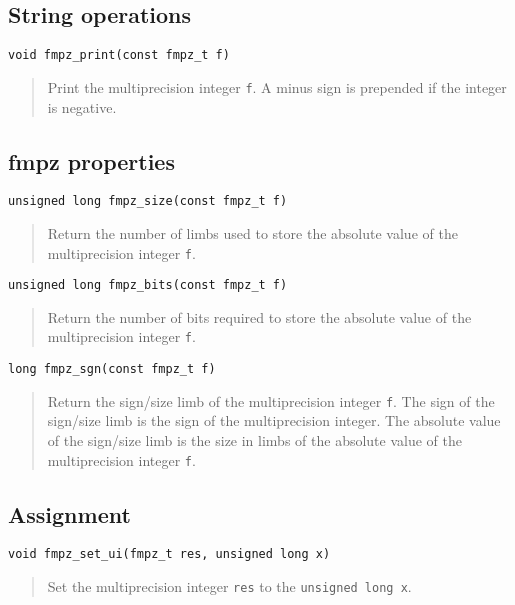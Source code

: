 \documentclass[a4paper,10pt]{article}
\newcommand{\code}{\lstinline}
\begin{document}
\subsection{String operations}

\begin{lstlisting}
void fmpz_print(const fmpz_t f)
\end{lstlisting}
\begin{quote}
Print the multiprecision integer \code{f}. A minus sign is prepended if the integer is negative.
\end{quote}

\subsection{fmpz properties}

\begin{lstlisting}
unsigned long fmpz_size(const fmpz_t f)
\end{lstlisting}
\begin{quote}
Return the number of limbs used to store the absolute value of the multiprecision integer \code{f}.
\end{quote}

\begin{lstlisting}
unsigned long fmpz_bits(const fmpz_t f)
\end{lstlisting}
\begin{quote}
Return the number of bits required to store the absolute value of the multiprecision integer \code{f}.
\end{quote}

\begin{lstlisting}
long fmpz_sgn(const fmpz_t f)
\end{lstlisting}
\begin{quote}
Return the sign/size limb of the multiprecision integer \code{f}. The sign of the sign/size limb is the sign of the multiprecision integer. The absolute value of the sign/size limb is the size in limbs of the absolute value of the multiprecision integer \code{f}. 
\end{quote}

\subsection{Assignment}

\begin{lstlisting}
void fmpz_set_ui(fmpz_t res, unsigned long x)
\end{lstlisting}
\begin{quote}
Set the multiprecision integer \code{res} to the \code{unsigned long x}.
\end{quote}
\end{document}
